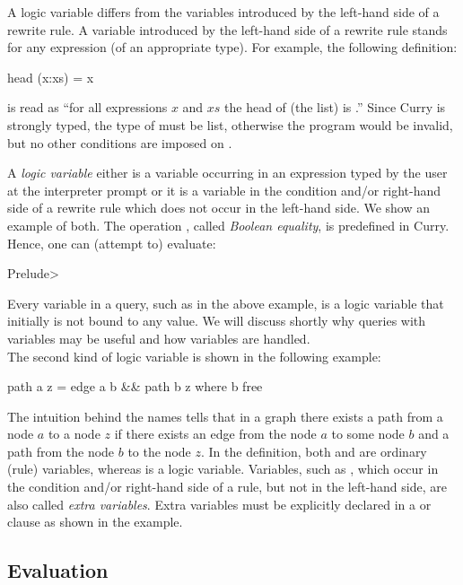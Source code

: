 A logic variable differs from the variables introduced by the left-hand
side of a rewrite rule.
A variable introduced by the left-hand side of a rewrite rule
stands for any expression (of an appropriate type).
For example, the following definition:
%
\begin{prog}
head (x:xs) = x
\end{prog}
%
is read as ``for all expressions $x$ and $xs$ the head of (the list)
 is .''
Since Curry is strongly typed, the type of  must be list,
otherwise the program would be invalid,
but no other conditions are imposed on . 

A \emph{logic variable} either is a variable occurring in an expression
typed by the user at the interpreter prompt or
it is a variable in the condition and/or right-hand side of
a rewrite rule which does not occur in the left-hand side.
We show an example of both.
The operation \ccode{==},
called \emph{Boolean equality},
is predefined in Curry.
Hence, one can (attempt to) evaluate:
%
\begin{prog}
Prelude> 
\end{prog}
%
Every variable in a query, such as  in the above example,
is a logic variable that initially is not bound to any value.
We will discuss shortly why queries with variables
may be useful and how variables are handled.
\\[1ex]
The second kind of logic variable is shown in the following
example:
%
\begin{prog}
path a z = edge a b \&\& path b z   where b free
\end{prog}
%
The intuition behind the names tells that in a graph there exists a path
from a node $a$ to a node $z$ if there exists an edge from
the node $a$ to some node $b$ and a path from the node $b$
to the node $z$.
In the definition, both  and  are ordinary (rule)
variables, whereas  is a logic variable.
Variables, such as , which occur in the condition
and/or right-hand side of a rule, but not in the left-hand side,
are also called \emph{extra variables}.
Extra variables must be explicitly declared 
in a  or  clause as shown in the example.

\subsection{Evaluation}

